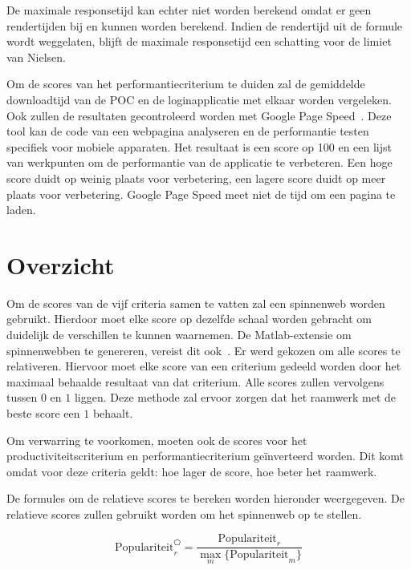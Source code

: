 De maximale responsetijd kan echter niet worden berekend omdat er geen rendertijden bij \st{} en \lungo{} kunnen worden berekend.
Indien de rendertijd uit de formule wordt weggelaten,  blijft de maximale responsetijd een schatting voor de limiet van Nielsen.

Om de scores van het performantiecriterium te duiden zal de gemiddelde downloadtijd van de POC en de loginapplicatie met elkaar worden vergeleken.
Ook zullen de resultaten gecontroleerd worden met Google Page Speed~\cite{Morgan2011}. 
Deze tool kan de code van een webpagina analyseren en de performantie testen specifiek voor mobiele apparaten.
Het resultaat is een score op 100 en een lijst van werkpunten om de performantie van de applicatie te verbeteren.
Een hoge score duidt op weinig plaats voor verbetering,  een lagere score duidt op meer plaats voor verbetering.
Google Page Speed meet niet de tijd om een pagina te laden.


\section{Overzicht}
\label{sec:vergelijking-spinnenweb}

Om de scores van de vijf criteria samen te vatten zal een spinnenweb worden gebruikt.
Hierdoor moet elke score op dezelfde schaal worden gebracht om duidelijk de verschillen te kunnen waarnemen.
De Matlab-extensie om spinnenwebben te genereren, vereist dit ook~\cite{Martti2007}.
Er werd gekozen om alle scores te relativeren.
Hiervoor moet elke score van een criterium gedeeld worden door het maximaal behaalde resultaat van dat criterium.
Alle scores zullen vervolgens tussen $0$ en $1$ liggen.
Deze methode zal ervoor zorgen dat het raamwerk met de beste score een $1$ behaalt.

Om verwarring te voorkomen, moeten ook de scores voor het productiviteitscriterium en performantiecriterium geïnverteerd worden.
Dit komt omdat voor deze criteria geldt:  hoe lager de score,  hoe beter het raamwerk.

De formules om de relatieve scores te bereken worden hieronder weergegeven.
De relatieve scores zullen gebruikt worden om het spinnenweb op te stellen.

\begin{equation}
  \text{Populariteit}_r^{\pentagon}=\frac{\text{Populariteit}_r}{\underset{m}{\max}\{\text{Populariteit}_m\}}
  \label{eq:rel-populariteit}
\end{equation}

